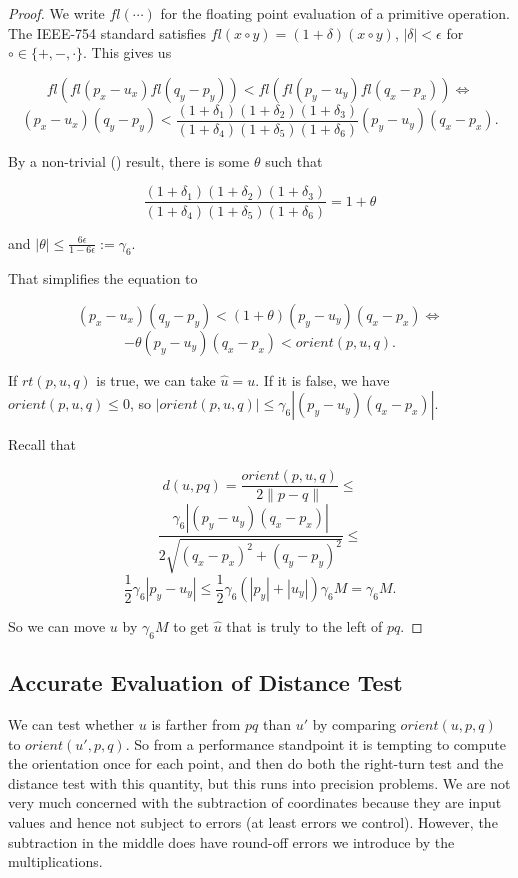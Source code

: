 \begin{proof}
    We write $fl(\cdots)$ for the floating point evaluation of a primitive 
    operation. The IEEE-754 standard satisfies 
    $fl(x \circ y) = (1 + \delta)(x \circ y)$, $|\delta| < \epsilon$ for
    $\circ \in \{+, -, \cdot\}$. This gives us

    $$fl(fl(p_x - u_x) fl(q_y - p_y)) < 
            fl(fl(p_y - u_y) fl(q_x - p_x)) \iff$$
    $$(p_x - u_x) (q_y - p_y) < \frac{(1 + \delta_1)(1 + \delta_2)(1 + \delta_3)}
    {(1 + \delta_4)(1 + \delta_5)(1 + \delta_6)} (p_y - u_y) (q_x - p_x).$$

    By a non-trivial () result, there is some $\theta$
    such that

    $$\frac{(1 + \delta_1)(1 + \delta_2)(1 + \delta_3)}{(1 + \delta_4)(1 + \delta_5)(1 + \delta_6)} = 1 + \theta$$

    and $|\theta| \leq \frac{6\epsilon}{1 - 6\epsilon} := \gamma_6$.

    That simplifies the equation to

    $$(p_x - u_x) (q_y - p_y) < (1 + \theta) (p_y - u_y) (q_x - p_x) \iff$$
    $$-\theta (p_y - u_y) (q_x - p_x) < orient(p, u, q).$$

    If $rt(p, u, q)$ is true, we can take $\hat{u} = u$. If it is false,
    we have $orient(p, u, q) \leq 0$, so
    $|orient(p, u, q)| \leq \gamma_6 |(p_y - u_y) (q_x - p_x)|$.

    Recall that 

    $$d(u, pq) = \frac{orient(p, u, q)}{2 \lVert p - q \rVert} \leq$$
    $$\frac{\gamma_6 |(p_y - u_y) (q_x - p_x)|}{2 \sqrt{(q_x - p_x)^2 + (q_y - p_y)^2}} \leq$$
    $$\frac{1}{2}\gamma_6 |p_y - u_y| \leq 
            \frac{1}{2} \gamma_6 (|p_y| + |u_y|)\gamma_6 M = \gamma_6 M.$$

    So we can move $u$ by $\gamma_6 M$ to get $\hat{u}$ that is truly to the 
    left of $pq$.
\end{proof}

\subsection{Accurate Evaluation of Distance Test}

We can test whether $u$ is farther from $pq$ than $u'$ by comparing
$orient(u, p, q)$ to $orient(u', p, q)$. So from a performance standpoint it
is tempting to compute the orientation once for each point, and then do both
the right-turn test and the distance test with this quantity, but this
runs into precision problems. We are not very much concerned with the
subtraction of coordinates because they are input values and hence not
subject to errors (at least errors we control). However, the subtraction 
in the middle does have round-off errors we introduce by the multiplications.


